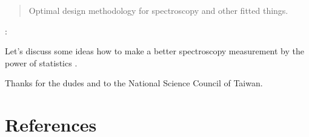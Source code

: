 \documentclass[draft,12pt]{iopart}
\begin{document}
\author{G Imreh}
\address{Institute of Atomic and Molecular Sciences, Academia Sinica, Taiwan}
\begin{abstract}
Optimal design methodology for spectroscopy and other fitted things.
\end{abstract}

:

\pacs{}
\submitto{\MST}

Let's discuss some ideas how to make a better spectroscopy measurement by the power of statistics \cite{Atkinson1992}.

\ack Thanks for the dudes and to the National Science Council of Taiwan.

\section*{References}


\end{document}
